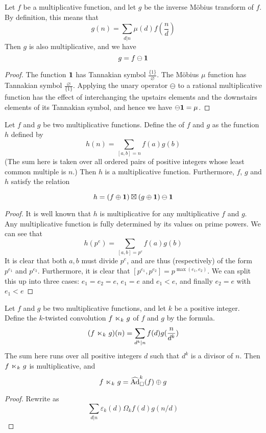 \begin{propdef}
Let $f$ be a multiplicative function, and let $g$ be the inverse M{\"o}bius transform of $f$. By definition, this means that
$$  g(n) = \sum_{d \vert n} \mu(d) f(\frac{n}{d})  $$
Then $g$ is also multiplicative, and we have
$$  g = f \ominus \mathbf{1}   $$
\end{propdef}
\begin{proof}
The function $\mathbf{1}$ has Tannakian symbol $\frac{ \{  1 \} }{ \varnothing }$. The M{\"o}bius $\mu$ function has Tannakian symbol $\frac{ \varnothing }{ \{  1 \} }$. Applying the unary operator $\ominus$ to a rational multiplicative function has the effect of interchanging the upstairs elements and the downstairs elements of its Tannakian symbol, and hence we have $\ominus \mathbf{1} = \mu$.
\end{proof}

\begin{propdef}
Let $f$ and $g$ be two multiplicative functions. Define the  of $f$ and $g$ as the function $h$ defined by
$$ h(n) = \sum_{[a,b] = n} f(a) g(b)   $$
(The sum here is taken over all ordered pairs of positive integers whose least common multiple is $n$.) Then $h$ is a multiplicative function. Furthermore, $f$, $g$ and $h$ satisfy the relation

$$  h = (f \oplus \mathbf{1}) \boxtimes (g \oplus \mathbf{1}) \ominus \mathbf{1}   $$

\end{propdef}

\begin{proof}
It is well known that $h$ is multiplicative for any multiplicative $f$ and $g$. Any multiplicative function is fully determined by its values on prime powers. We can see that
$$h(p^e) = \sum_{[a, b] = p^e} f(a)g(b)$$
It is clear that both $a, b$ must divide $p^e$, and are thus (respectively) of the form $p^{e_1}$ and $p^{e_2}$. Furthermore, it is clear that $[p^{e_1}, p^{e_2}] = p^{\max(e_1, e_2)}$. We can split this up into three cases: $e_1 = e_2 = e$, $e_1 = e$ and $e_1 < e$, and finally $e_2 = e$ with $e_1 < e$
\end{proof}


\begin{propdef}
Let $f$ and $g$ be two multiplicative functions, and let $k$ be a positive integer. Define the $k$-twisted convolution $f \hspace{1pt} \ltimes_{k} \hspace{1pt} g$  of $f$ and $g$ by the formula.
$$  (f \hspace{1pt} \ltimes_{k} \hspace{1pt} g) (n) = \sum_{d^k \vert n} f(d) g(\frac{n}{d^k})   $$
The sum here runs over all positive integers $d$ such that $d^k$ is a divisor of $n$. Then $f \hspace{1pt} \ltimes_{k} \hspace{1pt} g$ is multiplicative, and 
$$  f \hspace{1pt} \ltimes_{k} \hspace{1pt} g =  \widehat{\text{Ad}}^{k}_{\square}(f) \oplus g  $$
\end{propdef}
\begin{proof}
Rewrite as 
$$  \sum_{d \vert n} \varepsilon_k(d) \Omega_k f(d) g(n/d)  $$
\end{proof}

